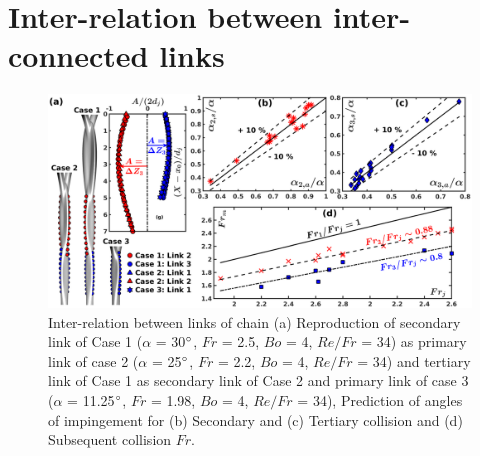 \documentclass{jfm}
\begin{document}
\section{Inter-relation between inter-connected links} 
\begin{figure}
	\centering
	\includegraphics[width=\linewidth]{Figure8}
	\caption{Inter-relation between links of chain (a) Reproduction of secondary link of Case 1 ($\alpha$ = 30$\degree$, $Fr$ = 2.5, $Bo$ = 4, $Re/Fr$ = 34) as primary link of case 2 ($\alpha$ = 25$\degree$, $Fr$ = 2.2, $Bo$ = 4, $Re/Fr$ = 34) and tertiary link of Case 1 as secondary link of Case 2 and primary link of case 3 ($\alpha$ = 11.25$\degree$, $Fr$ = 1.98, $Bo$ = 4, $Re/Fr$ = 34), Prediction of angles of impingement for (b) Secondary and (c) Tertiary collision and (d) Subsequent collision $Fr$.}
	\label{Figure::secondCollision}%
\end{figure}
\end{document}
